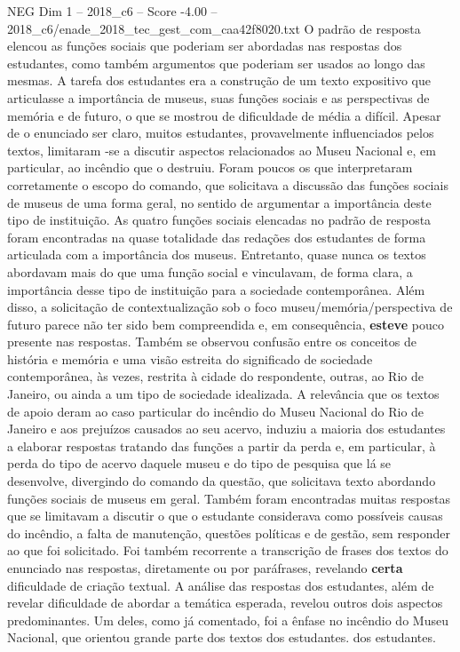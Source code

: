 \begin{textsample}{NEG Dim 1 – 2018\_c6 – Score -4.00 – 2018\_c6/enade\_2018\_tec\_gest\_com\_caa42f8020.txt}
O padrão de resposta elencou as funções sociais que poderiam ser abordadas nas respostas dos estudantes, como também argumentos que poderiam ser usados ao longo das mesmas.
A tarefa dos estudantes era a construção de um texto expositivo que articulasse a importância de museus, suas funções sociais e as perspectivas de memória e de futuro, o que se mostrou de dificuldade de média a difícil.
Apesar de o enunciado ser claro, muitos estudantes, provavelmente influenciados pelos textos, limitaram -se a discutir aspectos relacionados ao Museu Nacional e, em particular, ao incêndio que o destruiu.
Foram poucos os que interpretaram corretamente o escopo do comando, que solicitava a discussão das funções sociais de museus de uma forma geral, no sentido de argumentar a importância deste tipo de instituição.
As quatro funções sociais elencadas no padrão de resposta foram encontradas na quase totalidade das redações dos estudantes de forma articulada com a importância dos museus.
Entretanto, quase nunca os textos abordavam mais do que uma função social e vinculavam, de forma clara, a importância desse tipo de instituição para a sociedade contemporânea.
Além disso, a solicitação de contextualização sob o foco museu/memória/perspectiva de futuro parece não ter sido bem compreendida e, em consequência, \textbf{esteve} pouco presente nas respostas.
Também se observou confusão entre os conceitos de história e memória e uma visão estreita do significado de sociedade contemporânea, às vezes, restrita à cidade do respondente, outras, ao Rio de Janeiro, ou ainda a um tipo de sociedade idealizada.
A relevância que os textos de apoio deram ao caso particular do incêndio do Museu Nacional do Rio de Janeiro e aos prejuízos causados ao seu acervo, induziu a maioria dos estudantes a elaborar respostas tratando das funções a partir da perda e, em particular, à perda do tipo de acervo daquele museu e do tipo de pesquisa que lá se desenvolve, divergindo do comando da questão, que solicitava texto abordando funções sociais de museus em geral.
Também foram encontradas muitas respostas que se limitavam a discutir o que o estudante considerava como possíveis causas do incêndio, a falta de manutenção, questões políticas e de gestão, sem responder ao que foi solicitado.
Foi também recorrente a transcrição de frases dos textos do enunciado nas respostas, diretamente ou por paráfrases, revelando \textbf{certa} dificuldade de criação textual.
A análise das respostas dos estudantes, além de revelar dificuldade de abordar a temática esperada, revelou outros dois aspectos predominantes.
Um deles, como já comentado, foi a ênfase no incêndio do Museu Nacional, que orientou grande parte dos textos dos estudantes. dos estudantes.

\end{textsample}
